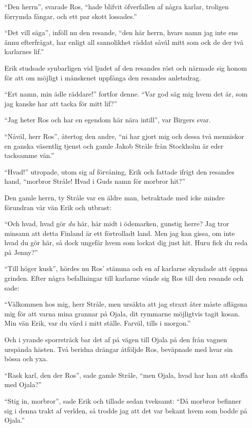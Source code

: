 ``Den herrn'', svarade Ros, ``hade blifvit öfverfallen af några karlar,
troligen förrymda fångar, och ett par skott lossades.''

``Det vill säga'', inföll nu den resande, ``den här herrn, hvars namn
jag inte ens ännu efterfrågat, har enligt all sannolikhet räddat såväl
mitt som ock de der två karlarnes lif.''

Erik studsade synbarligen vid ljudet af den resandes röst och närmade
sig honom för att om möjligt i månskenet uppfånga den resandes
anletsdrag.

``Ert namn, min ädle räddare!'' fortfor denne. ``Var god säg mig hvem
det är, som jag kanske har att tacka för mitt lif?''

``Jag heter Ros och har en egendom här nära intill'', var Birgers svar.

``Nåväl, herr Ros'', återtog den andre, ``ni har gjort mig och dessa två
menniskor en ganska väsentlig tjenst och gamle Jakob Stråle från
Stockholm är eder tacksamme vän.''

``Hvad!'' utropade, utom sig af förvåning, Erik och fattade ifrigt den
resandes hand, ``morbror Stråle! Hvad i Guds namn för morbror hit?''

Den gamle herrn, ty Stråle var en äldre man, betraktade med icke mindre
förundran vår vän Erik och utbrast:

``Och hvad, hvad gör \emph{du} här, här midt i ödemarken, gunstig herre?
Jag tror minsann att detta Finland är ett förtrolladt land. Men jag kan
gissa, om inte hvad du gör här, så dock ungefär hvem som lockat dig just
hit. Huru fick du reda på Jenny?''

``Till höger kusk'', hördes nu Ros' stämma och en af karlarne skyndade
att öppna grinden. Efter några befallningar till karlarne vände sig Ros
till den resande och sade:

``Välkommen hos mig, herr Stråle, men ursäkta att jag straxt åter måste
aflägsna mig för att varna mina grannar på Ojala, dit rymmarne
möjligtvis tagit kosan. Min vän Erik, var du värd i mitt ställe. Farväl,
tills i morgon.''

Och i yrande sporrsträck bar det af på vägen till Ojala på den från
vagnen urspända hästen. Två beridna drängar åtföljde Ros, beväpnade med
hvar sin bössa och yxa.

``Rask karl, den der Ros'', sade gamle Stråle, ``men Ojala, hvad har han
att skaffa med Ojala?''

``Stig in, morbror'', sade Erik och tillade sedan tveksamt: ``Då morbror
befinner sig i denna trakt af verlden, så trodde jag att det var bekant
hvem som bodde på Ojala.''

